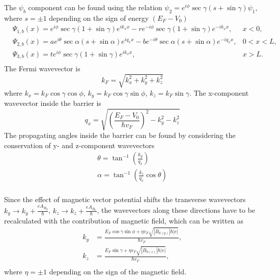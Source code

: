    The $\psi_b$ component can be found using the relation $\psi_2 = e^{i \phi} \sec{\gamma}(s + \sin{\gamma})\psi_1$, where $s = \pm 1$ depending on the sign of energy $(E_F -V_0)$
    \begin{equation} \label{2eq:b wavefunctions b field}
        \begin{aligned}
            &\Psi_{1,b}(x) = e^{i \phi} \sec{\gamma}(1 + \sin{\gamma})e^{ik_x x}- re^{-i \phi} \sec{\gamma}(1 + \sin{\gamma}) e^{-i k_x x}, &x<0,\\
            &\Psi_{2,b}(x) = ae^{i \theta} \sec{\alpha}(s + \sin{\alpha})e^{i q_x x}- be^{-i \theta} \sec{\alpha}(s + \sin{\alpha}) e^{-i q_x x}, &0<x<L,\\
            &\Psi_{3,b}(x) = te^{i \phi} \sec{\gamma}(1 + \sin{\gamma})e^{ik_x x}, &x>L.\\
        \end{aligned}
    \end{equation}
    The Fermi wavevector is 
    \begin{equation} \label{2eq:fermi wavevector}
        k_F = \sqrt{k_x^2+k_y^2+k_z^2} 
    \end{equation}
    where $k_x = k_F \cos{\gamma}\cos{\phi}$, $k_y = k_F \cos{\gamma} \sin{\phi}$, $k_z = k_F \sin{\gamma}$. 
    The x-component wavevector inside the barrier is 
    \begin{equation} \label{2eq:fermi wavevector in barrier}
        q_x = \sqrt{\left(\frac{E_F-V_0}{\hbar v_F}\right)^2-k_y^2-k_z^2}
    \end{equation}
    The propagating angles inside the barrier can be found by considering the conservation of y- and z-component wavevectors
    \begin{equation}\label{2eq:propagaing angles}
        \begin{aligned}
            \theta = \tan^{-1}\left(\frac{k_y}{q_x}\right)\\
            \alpha = \tan^{-1}\left(\frac{k_z}{q_x} \cos{\theta}\right)\\
        \end{aligned}
    \end{equation}
    
    Since the effect of magnetic vector potential shifts the transverse wavevectors $k_y \rightarrow k_y + \frac{eA_{B_y}}{\hbar}$, $k_z \rightarrow k_z + \frac{eA_{B_z}}{\hbar}$,
    the wavevectors along these directions have to be recalculated with the contribution of magnetic field, which can be written as
    \begin{equation} \label{2eq:transverse k with b field}
        \begin{aligned}
            k_y &= \frac{E_F \cos{\gamma} \sin{\phi}+ \eta v_F \sqrt{|B_{0(y)}|\hbar |e|}}{\hbar v_F},\\
            k_z &= \frac{E_F \sin{\gamma}+ \eta v_F \sqrt{|B_{0(z)}|\hbar |e|}}{\hbar v_F},\\
        \end{aligned}
    \end{equation}
    where $\eta = \pm 1$ depending on the sign of the magnetic field.\\


